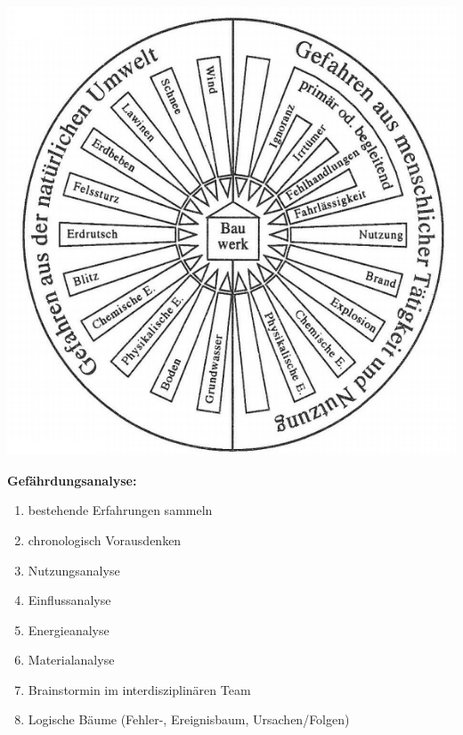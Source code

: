 \begin{multicols}{2}
			\includegraphics[width=\linewidth]{images/1Gefahren.PNG}
			
			
			\textbf{Gefährdungsanalyse:}
				\begin{enumerate}
					
					\item bestehende Erfahrungen  sammeln
					
					\item chronologisch Vorausdenken
					
					\item Nutzungsanalyse
					
					\item Einflussanalyse
					
					\item Energieanalyse
					
					\item Materialanalyse
					
					\item Brainstormin im interdisziplinären Team
					
					\item Logische Bäume (Fehler-, Ereignisbaum, Ursachen/Folgen)
					
					
				\end{enumerate}
			
			\medskip
			

\end{multicols}
